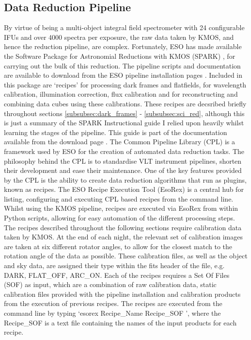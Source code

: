 \documentclass{literature}
\begin{document}
\subsection{Data Reduction Pipeline}\label{sec:reduction}
By virtue of being a multi-object integral field spectrometer with 24 configurable IFUs and over 4000 spectra per exposure, the raw data taken by KMOS, and hence the reduction pipeline, are complex. Fortunately, ESO has made available the Software Package for Astronomial Reductions with KMOS (SPARK) \citep{Davies2013}, for carrying out the bulk of this reduction. The pipeline scripts and documentation are available to download from the ESO pipeline installation pages \citep{ESO2015}. Included in this package are `recipes' for processing dark frames and flatfields, for wavelength calibration, illumination correction, flux calibration and for reconstructing and combining data cubes using these calibrations. These recipes are decsribed briefly throughout sections \ref{subsubsec:dark_frames} - \ref{subsubsec:sci_red}, although this is just a summary of the SPARK Instructional guide I relied upon heavily whilst learning the stages of the pipeline. This guide is part of the documentation available from the download page \citep{ESO2015}. The Common Pipeline Library (CPL) is a framework used by ESO for the creation of automated data reduction tasks. The philosophy behind the CPL is to standardise VLT instrument pipelines, shorten their development and ease their maintenance. One of the key features provided by the CPL is the ability to create data reduction algorithms that run as plugins, known as recipes. The ESO Recipe Execution Tool (EsoRex) is a central hub for listing, configuring and executing CPL based recipes from the command line. Whilst using the KMOS pipeline, recipes are executed via EsoRex from within Python scripts, allowing for easy automation of the different processing steps. The recipes described throughout the following sections require calibration data taken by KMOS. At the end of each night, the relevant set of calibration images are taken at six different rotator angles, to allow for the closest match to the rotation angle of the data as possible. These calibration files, as well as the object and sky data, are assigned their type within the fits header of the file, e.g. DARK, FLAT\_OFF, ARC\_ON. Each of the recipes requires a Set Of Files (SOF) as input, which are a combination of raw calibration data, static calibration files provided with the pipeline installation and calibration products from the execution of previous recipes. The recipes are executed from the command line by typing `esorex \* Recipe\_Name \* \* Recipe\_SOF \*', where the Recipe\_SOF is a text file containing the names of the input products for each recipe.   \\ 
\end{document}
